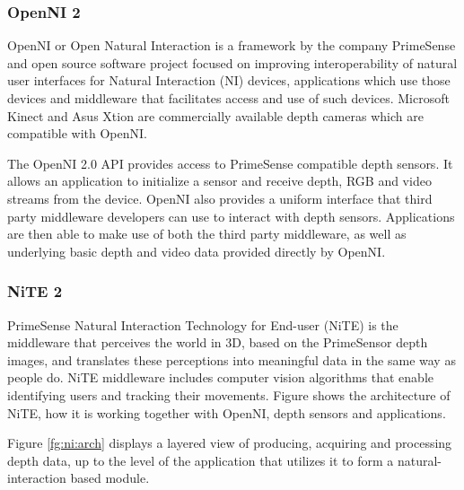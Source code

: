 \subsubsection{OpenNI 2} OpenNI or Open Natural Interaction \cite{11} is a framework by the company PrimeSense and open source software project focused on improving interoperability of natural user interfaces for Natural Interaction (NI) devices, applications which use those devices and middleware that facilitates access and use of such devices. Microsoft Kinect and Asus Xtion are commercially available depth cameras which are compatible with OpenNI.

The OpenNI 2.0 API provides access to PrimeSense compatible depth sensors. It allows an application to initialize a sensor and receive depth, RGB and video streams from the device. OpenNI also provides a uniform interface that third party middleware developers can use to interact with depth sensors. Applications are then able to make use of both the third party middleware, as well as underlying basic depth and video data provided directly by OpenNI.

\subsubsection{NiTE 2} \label{sec:nite} PrimeSense Natural Interaction Technology for End-user (NiTE) \cite{12} is the middleware that perceives the world in 3D, based on the PrimeSensor depth images, and translates these perceptions into meaningful data in the same way as people do. NiTE middleware includes computer vision algorithms that enable identifying users and tracking their movements. Figure shows the architecture of NiTE, how it is working together with OpenNI, depth sensors and applications.

Figure \ref{fg:ni:arch} displays a layered view of producing, acquiring and processing depth data, up to the level of the application that utilizes it to form a natural- interaction based module. 



